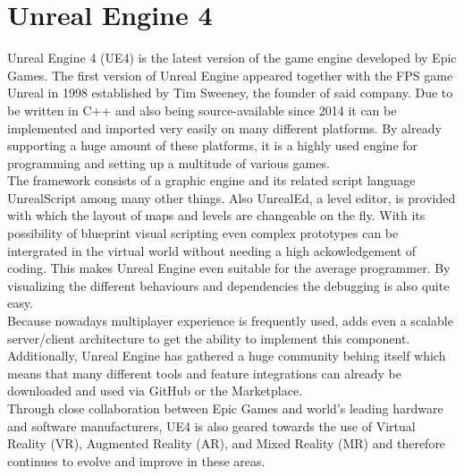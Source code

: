 \documentclass{report}
\begin{document}
	\section[Unreal Engine 4]{Unreal Engine 4 \textsc{\small{\cite{UE4}}}}
	\startsection
		Unreal Engine 4 (UE4) is the latest version of the game engine developed by Epic Games. The first version of Unreal Engine appeared together with the FPS game Unreal in 1998 established by Tim Sweeney, the founder of said company. Due to be written in C++ and also being source-available since 2014 it can be implemented and imported very easily on many different platforms. By already supporting a huge amount of these platforms, it is a highly used engine for programming and setting up a multitude of various games. \\
		The framework consists of a graphic engine and its related script language UnrealScript among many other things. Also UnrealEd, a level editor, is provided with which the layout of maps and levels are changeable on the fly. With its possibility of blueprint visual scripting even complex prototypes can be intergrated in the virtual world without needing a high ackowledgement of coding. This makes Unreal Engine even suitable for the average programmer. By visualizing the different behaviours and dependencies the debugging is also quite easy. \\
		Because nowadays multiplayer experience is frequently used, adds even a scalable server/client architecture to get the ability to implement this component. Additionally, Unreal Engine has gathered a huge community behing itself which means that many different tools and feature integrations can already be downloaded and used via GitHub or the Marketplace. \\
		Through close collaboration between Epic Games and world's leading hardware and software manufacturers, UE4 is also geared towards the use of Virtual Reality (VR), Augmented Reality (AR), and Mixed Reality (MR) and therefore continues to evolve and improve in these areas.
	\closesection
\end{document}
